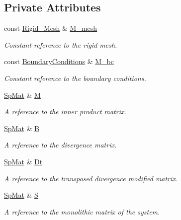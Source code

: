 \subsection*{Private Attributes}
\begin{DoxyCompactItemize}
\item 
const \hyperlink{classFVCode3D_1_1Rigid__Mesh}{Rigid\+\_\+\+Mesh} \& \hyperlink{classFVCode3D_1_1global__BulkBuilder_ab7654cc72d9bb696193e1de09a8ab6c3}{M\+\_\+mesh}
\begin{DoxyCompactList}\small\item\em Constant reference to the rigid mesh. \end{DoxyCompactList}\item 
const \hyperlink{classFVCode3D_1_1BoundaryConditions}{Boundary\+Conditions} \& \hyperlink{classFVCode3D_1_1global__BulkBuilder_a84240894f7c45fe5633fa7e87335dc1c}{M\+\_\+bc}
\begin{DoxyCompactList}\small\item\em Constant reference to the boundary conditions. \end{DoxyCompactList}\item 
\hyperlink{namespaceFVCode3D_ac1032289d96638cf0ad6c52ef639095f}{Sp\+Mat} \& \hyperlink{classFVCode3D_1_1global__BulkBuilder_ab60d3a62f393fea1b68da0a6d0598962}{M}
\begin{DoxyCompactList}\small\item\em A reference to the inner product matrix. \end{DoxyCompactList}\item 
\hyperlink{namespaceFVCode3D_ac1032289d96638cf0ad6c52ef639095f}{Sp\+Mat} \& \hyperlink{classFVCode3D_1_1global__BulkBuilder_aceb03f04bf9045a8a0b139a7f24a31c3}{B}
\begin{DoxyCompactList}\small\item\em A reference to the divergence matrix. \end{DoxyCompactList}\item 
\hyperlink{namespaceFVCode3D_ac1032289d96638cf0ad6c52ef639095f}{Sp\+Mat} \& \hyperlink{classFVCode3D_1_1global__BulkBuilder_a30510e925ae588b3993cf39710dcb0e8}{Dt}
\begin{DoxyCompactList}\small\item\em A reference to the transposed divergence modified matrix. \end{DoxyCompactList}\item 
\hyperlink{namespaceFVCode3D_ac1032289d96638cf0ad6c52ef639095f}{Sp\+Mat} \& \hyperlink{classFVCode3D_1_1global__BulkBuilder_a3e29e74ddbefa92dd03bc333cc43bfd5}{S}
\begin{DoxyCompactList}\small\item\em A reference to the monolithic matrix of the system. \end{DoxyCompactList}\end{DoxyCompactItemize}



